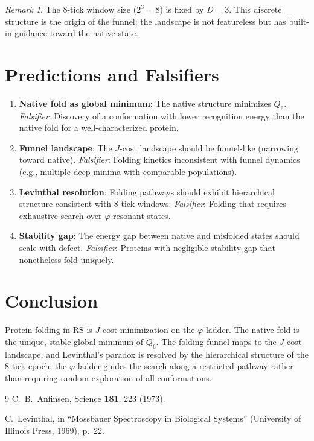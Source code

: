\documentclass[12pt,a4paper]{article}
\theoremstyle{definition}
\theoremstyle{remark}
\newtheorem{remark}[theorem]{Remark}
\begin{document}
\begin{remark}
The 8-tick window size ($2^3 = 8$) is fixed by $D = 3$.  This
discrete structure is the origin of the funnel: the landscape is not
featureless but has built-in guidance toward the native state.
\end{remark}

\section{Predictions and Falsifiers}
\label{sec:falsifiers}

\begin{enumerate}[label=(\roman*)]
\item \textbf{Native fold as global minimum}: The native structure
  minimizes $Q_6$.  \textit{Falsifier}: Discovery of a conformation
  with lower recognition energy than the native fold for a
  well-characterized protein.

\item \textbf{Funnel landscape}: The $J$-cost landscape should be
  funnel-like (narrowing toward native).  \textit{Falsifier}: Folding
  kinetics inconsistent with funnel dynamics (e.g., multiple deep
  minima with comparable populations).

\item \textbf{Levinthal resolution}: Folding pathways should exhibit
  hierarchical structure consistent with 8-tick windows.
  \textit{Falsifier}: Folding that requires exhaustive search over
  $\varphi$-resonant states.

\item \textbf{Stability gap}: The energy gap between native and
  misfolded states should scale with defect.  \textit{Falsifier}:
  Proteins with negligible stability gap that nonetheless fold
  uniquely.
\end{enumerate}

\section{Conclusion}
\label{sec:conclusion}

Protein folding in RS is $J$-cost minimization on the $\varphi$-ladder.
The native fold is the unique, stable global minimum of $Q_6$.  The
folding funnel maps to the $J$-cost landscape, and Levinthal's paradox
is resolved by the hierarchical structure of the 8-tick epoch: the
$\varphi$-ladder guides the search along a restricted pathway rather
than requiring random exploration of all conformations.

\begin{thebibliography}{9}
C.~B.~Anfinsen, Science \textbf{181}, 223 (1973).

C.~Levinthal, in ``Mossbauer Spectroscopy in Biological Systems''
(University of Illinois Press, 1969), p.~22.
\end{thebibliography}
\end{document}
